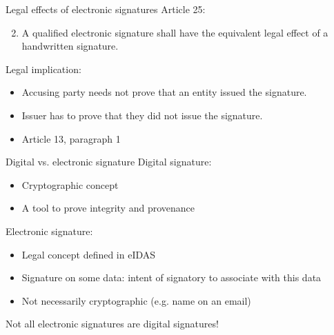 \begin{frame}{Legal effects of electronic signatures}
  \pause
  Article 25:
  \begin{enumerate}
    \setcounter{enumi}{1}
    \item A qualified electronic signature shall have the equivalent legal effect of a handwritten signature.
  \end{enumerate}

  \vspace*{1em}

  \pause
  Legal implication:
  \begin{itemize}[<+(1)->]
    \item Accusing party needs not prove that an entity issued the signature.
    \item Issuer has to prove that they did not issue the signature.
    \item Article 13, paragraph 1
  \end{itemize}
\end{frame}

\begin{frame}{Digital vs. electronic signature}
  Digital signature:
  \begin{itemize}[<+(1)->]
    \item Cryptographic concept
    \item A tool to prove integrity and provenance
  \end{itemize}

  \vspace*{1em}

  \pause
  Electronic signature:
  \begin{itemize}[<+(1)->]
    \item Legal concept defined in eIDAS
    \item Signature on some data: intent of signatory to associate with this data
    \item Not necessarily cryptographic (e.g. name on an email)
  \end{itemize}

  \vspace*{1em}

  \pause
  Not all electronic signatures are digital signatures!
\end{frame}

